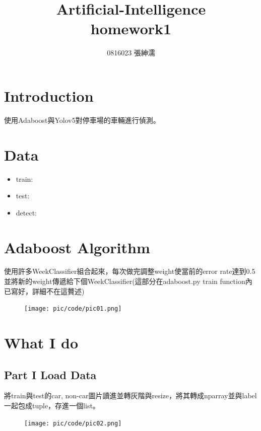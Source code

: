 \documentclass[12,a4paper]{article}
\title{{\Huge Artificial-Intelligence} \\ homework1 }
\author{0816023 張紳濡}
\date{}
\begin{document}
\maketitle
\thispagestyle{fancy}
\section{Introduction}
使用Adaboost與Yolov5對停車場的車輛進行偵測。
\section{Data}
\begin{itemize}
\item train: 
\item test: 
\item detect: 
\end{itemize}
\section{Adaboost Algorithm}
使用許多WeekClassifier組合起來，每次做完調整weight使當前的error rate達到0.5並將新的weight傳遞給下個WeekClassifier(這部分在adaboost.py train function內已寫好，詳細不在這贅述)
\begin{figure}[!ht]
\centering
\texttt{[image: pic/code/pic01.png]}
\end{figure}
\section{What I do}
\subsection{Part I Load Data}
將train與test的car, non-car圖片讀進並轉灰階與resize，將其轉成nparray並與label一起包成tuple，存進一個list。
\begin{figure}[!ht]
\centering
\texttt{[image: pic/code/pic02.png]}
\end{figure}
\end{document}
